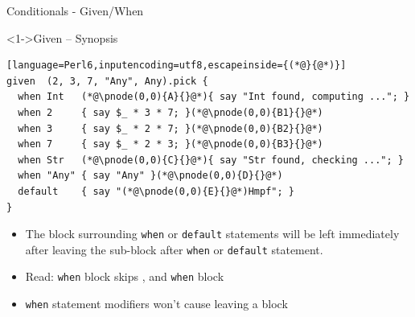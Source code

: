 \begin{frame}[fragile]{Conditionals - Given/When}
\begin{block}<1->{Given -- Synopsis}
\small
\begin{lstlisting}[language=Perl6,inputencoding=utf8,escapeinside={(*@}{@*)}]
given  (2, 3, 7, "Any", Any).pick {
  when Int   (*@\pnode(0,0){A}{}@*){ say "Int found, computing ..."; }
  when 2     { say $_ * 3 * 7; }(*@\pnode(0,0){B1}{}@*)
  when 3     { say $_ * 2 * 7; }(*@\pnode(0,0){B2}{}@*)
  when 7     { say $_ * 2 * 3; }(*@\pnode(0,0){B3}{}@*)
  when Str   (*@\pnode(0,0){C}{}@*){ say "Str found, checking ..."; }
  when "Any" { say "Any" }(*@\pnode(0,0){D}{}@*)
  default    { say "(*@\pnode(0,0){E}{}@*)Hmpf"; }
}
\end{lstlisting}
\end{block}

\begin{itemize}
\item<1-> The block surrounding \texttt{when} or \texttt{default} statements will be left immediately after leaving the sub-block after \texttt{when} or \texttt{default} statement.
\item<2-> Read:  \texttt{when} block skips ,  and  \texttt{when} block
\item<4-> \texttt{when} statement modifiers won't cause leaving a block
\end{itemize}
\end{frame}

